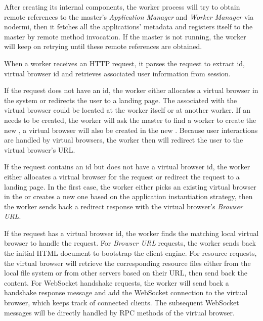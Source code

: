 
After creating its internal components, the worker process will try to obtain
remote references to the master's \emph{Application Manager} and \emph{Worker
Manager} via nodermi, then it fetches all the applications' metadata and
registers itself to the master by remote method invocation. If the master is
not running, the worker will keep on retrying until these remote references
are obtained.


When a worker receives an HTTP request, it parses the request to extract
\appins id, virtual browser id and retrieves associated user information from
session.

If the request does not have an \appins id, the worker either allocates a
virtual browser in the system or redirects the user to a landing page.  The
\appins{} associated with the virtual browser could be located at the worker itself or
at another worker.  If an \appins{} needs to be created, the worker will ask
the master to  find a worker to create the new \appins{}, a virtual browser
will also be created in the new \appins{}.  Because user interactions are
 handled by virtual browsers, the worker then will redirect the user
to the virtual browser's URL. 

If the request contains an \appins id but does not have a virtual browser id, 
the worker either allocates a virtual browser for the request or
redirect the request to a landing page.
In the first case, the worker either 
picks an existing virtual browser in the \appins  or creates a new one based on
the application instantiation strategy, then the worker sends back a redirect
response with  the virtual browser's \emph{Browser URL}.

If the request has a virtual browser id, the worker finds the matching local
virtual browser to handle the request. For \emph{Browser URL} requests, the
worker sends back the initial  HTML document to bootstrap the client engine.
For resource requests, the virtual browser will retrieve the corresponding
resource files either from the local file system or from other servers based 
on their URL, then send back the content.
For WebSocket handshake requests, the worker will send back a handshake
response message and add the WebSocket connection to the virtual browser,
which keeps track of connected clients.
The subsequent WebSocket messages will be directly handled by RPC methods
of the virtual browser.


